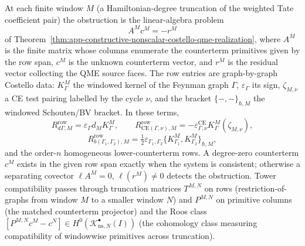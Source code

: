 At each finite window \(M\) (a Hamiltonian-degree truncation of the
weighted Tate coefficient pair) the obstruction is the linear-algebra
problem
\[
  A^M c^M=-r^M
\]
of Theorem~\ref{thm:app-constructive-nonscalar-costello-qme-realization},
where \(A^M\) is the finite matrix whose columns enumerate the
counterterm primitives given by the row span, \(c^M\) is the
unknown counterterm vector, and \(r^M\) is the residual vector
collecting the QME source faces.  The row entries are graph-by-graph
Costello data: \(K^M_\Gamma\) the windowed kernel of the Feynman graph
\(\Gamma\), \(\varepsilon_\Gamma\) its sign, \(\zeta_{M,\nu}\) a CE
test pairing labelled by the cycle \(\nu\), and the bracket
\(\{-,-\}_{\hbar,M}\) the windowed Schouten/BV bracket.  In these
terms,
\[
  R^{\mathrm{row}}_{d\Gamma,M}
   =\varepsilon_\Gamma d_M K^M_\Gamma,
  \qquad
  R^{\mathrm{row}}_{\mathrm{CE}(\Gamma,\nu),M}
   =-\varepsilon^{\mathrm{CE}}_{\Gamma,\nu}K^M_\Gamma(\zeta_{M,\nu}),
\]
\[
  R^{\mathrm{row}}_{b(\Gamma_1,\Gamma_2),M}
   =\tfrac12\varepsilon_{\Gamma_1,\Gamma_2}
     \{K^M_{\Gamma_1},K^M_{\Gamma_2}\}_{\hbar,M},
\]
and the order-\(n\) homogeneous lower-counterterm rows.  A degree-zero
counterterm \(c^M\) exists in the given row span exactly when the
system is consistent; otherwise a separating covector
\(\ell A^M=0\), \(\ell(r^M)\neq0\) detects the obstruction.  Tower
compatibility passes through truncation matrices \(T^{M,N}\) on rows
(restriction-of-graphs from window \(M\) to a smaller window \(N\)) and
\(P^{M,N}\) on primitive columns (the matched counterterm projector)
and the Roos class \([P^{M,N}c^M-c^N]\in H^0(\mathcal K^\bullet_{\mathrm{ns},N}(I))\)
(the cohomology class measuring compatibility of windowwise primitives
across truncation).

